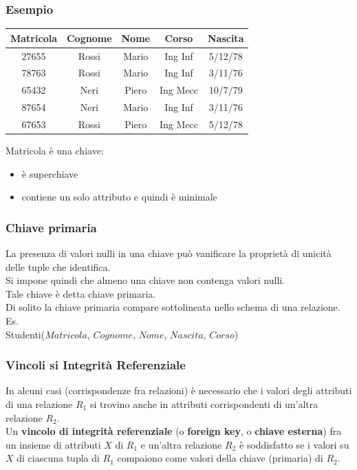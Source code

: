 \documentclass[../main.tex]{subfiles}
\begin{document}
	\subsubsection{Esempio}
	\begin{center}
		\begin{tabular}{ |c|c|c|c|c| }
			\hline
			\textbf{Matricola} & \textbf{Cognome} & \textbf{Nome} & \textbf{Corso} & \textbf{Nascita}\\
			\hline
			27655 & Rossi & Mario & Ing Inf & 5/12/78\\
			78763 & Rossi & Mario & Ing Inf & 3/11/76\\
			65432 & Neri & Piero & Ing Mecc & 10/7/79\\
			87654 & Neri & Mario & Ing Inf & 3/11/76\\
			67653 & Rossi & Piero & Ing Mecc & 5/12/78\\
			\hline
		\end{tabular}
	\end{center}
	Matricola è una chiave:
	\begin{itemize}
		\item è superchiave
		\item contiene un solo attributo e quindi è minimale
	\end{itemize}
	\subsubsection{Chiave primaria}
	La presenza di valori nulli in una chiave può vanificare la proprietà di unicità delle tuple che identifica.\\
	Si impone quindi che almeno una chiave non contenga valori nulli.\\
	Tale chiave è detta chiave primaria.\\
	Di solito la chiave primaria compare sottolineata nello schema di una relazione.\\
	Es.\\
	Studenti($Matricola$, $Cognome$, $Nome$, $Nascita$, $Corso$)
	\subsubsection{Vincoli si Integrità Referenziale}
	In alcuni casi (corrispondenze fra relazioni) è necessario che i valori degli attributi di una relazione $R_1$ si trovino anche in attributi corrispondenti di un’altra relazione $R_2$.\\
	Un \textbf{vincolo di integrità referenziale} (o \textbf{foreign key}, o \textbf{chiave esterna}) fra un insieme di attributi $X$ di $R_1$ e un’altra relazione $R_2$ è soddisfatto se i valori su $X$ di ciascuna tupla di $R_1$ compaiono come valori della chiave (primaria) di $R_2$.
\end{document}
